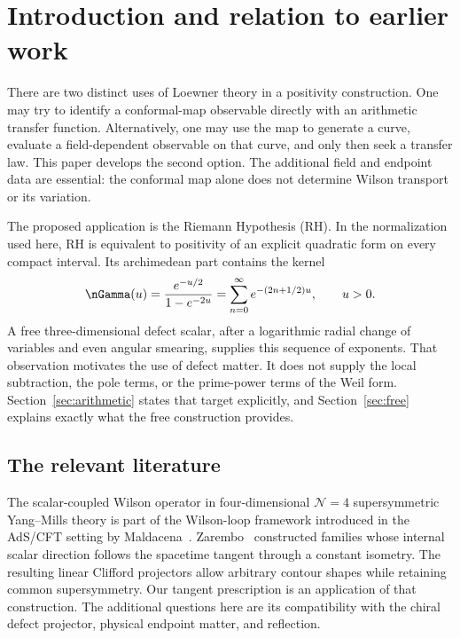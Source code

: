 \section{Introduction and relation to earlier work}\label{sec:intro}

There are two distinct uses of Loewner theory in a positivity construction.
One may try to identify a conformal-map observable directly with an
arithmetic transfer function. Alternatively, one may use the map to
generate a curve, evaluate a field-dependent observable on that curve,
and only then seek a transfer law. This paper develops the second option.
The additional field and endpoint data are essential: the conformal map
alone does not determine Wilson transport or its variation.

The proposed application is the Riemann Hypothesis (RH). In the
normalization used here, RH is equivalent to positivity of an explicit
quadratic form on every compact interval. Its archimedean part contains
the kernel
\begin{equation}\label{eq:intro-tower}
 \nGamma(u)=\frac{e^{-u/2}}{1-e^{-2u}}
 =\sum_{n=0}^{\infty}e^{-(2n+1/2)u},\qquad u>0.
\end{equation}
A free three-dimensional defect scalar, after a logarithmic radial
change of variables and even angular smearing, supplies this sequence
of exponents. That observation motivates the use of defect matter.
It does not supply the local subtraction, the pole terms, or the
prime-power terms of the Weil form. Section~\ref{sec:arithmetic} states
that target explicitly, and Section~\ref{sec:free} explains exactly what
the free construction provides.

\subsection{The relevant literature}

The scalar-coupled Wilson operator in four-dimensional
$\mathcal N=4$ supersymmetric Yang--Mills theory is part of the
Wilson-loop framework introduced in the AdS/CFT setting by
Maldacena~\cite{Maldacena}. Zarembo~\cite{Zarembo} constructed families
whose internal scalar direction follows the spacetime tangent through
a constant isometry. The resulting linear Clifford projectors allow
arbitrary contour shapes while retaining common supersymmetry.
Our tangent prescription is an application of that construction. The
additional questions here are its compatibility with the chiral defect
projector, physical endpoint matter, and reflection.

